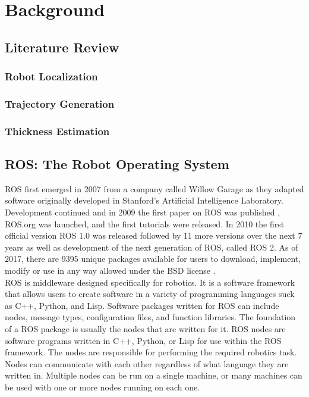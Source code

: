 \chapter{Background}
\label{chap:background}
\section{Literature Review}
\label{sec:litreview}
\subsection{Robot Localization}
\label{sec:localiz}
\subsection{Trajectory Generation}
\label{sec:traj}
\subsection{Thickness Estimation}
\label{sec:thick}
\section{ROS: The Robot Operating System}
\label{sec:ros}

ROS first emerged in 2007 from a company called Willow Garage as they adapted software originally developed in Stanford's Artificial Intelligence Laboratory. Development continued and in 2009 the first paper on ROS was published \cite{rosfirst}, ROS.org was launched, and the first tutorials were released. In 2010 the first official version ROS 1.0 was released followed by 11 more versions over the next 7 years as well as development of the next generation of ROS, called ROS 2. As of 2017, there are 9395 unique packages available for users to download, implement, modify or use in any way allowed under the BSD license \cite{http://download.ros.org/downloads/metrics/metrics-report-2017-07.pdf}.\\

ROS is middleware designed specifically for robotics. It is a software framework that allows users to create software in a variety of programming languages suck as C++, Python, and Lisp. Software packages written for ROS can include nodes, message types, configuration files, and function libraries. The foundation of a ROS package is usually the nodes that are written for it. ROS nodes are software programs written in C++, Python, or Lisp for use within the ROS framework. The nodes are responsible for performing the required robotics task. Nodes can communicate with each other regardless of what language they are written in. Multiple nodes can be run on a single machine, or many machines can be used with one or more nodes running on each one.\\

